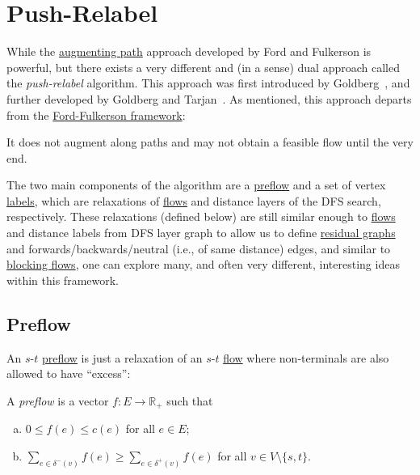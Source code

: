 \section{Push-Relabel}
While the \hyperref[def:augmenting-path]{augmenting path} approach developed by Ford and Fulkerson is powerful, but there exists a very different and (in a sense) dual approach called the \emph{push-relabel} algorithm. This approach was first introduced by Goldberg~\cite{goldberg1985new}, and further developed by Goldberg and Tarjan~\cite{goldberg1988new}. As mentioned, this approach departs from the \hyperref[algo:Ford-Fulkerson]{Ford-Fulkerson framework}:

\begin{note}
	It does not augment along paths and may not obtain a feasible flow until the very end.
\end{note}

The two main components of the algorithm are a \hyperref[def:preflow]{preflow} and a set of vertex \hyperref[def:label]{labels}, which are relaxations of \hyperref[def:flow]{flows} and distance layers of the DFS search, respectively. These relaxations (defined below) are still similar enough to \hyperref[def:flow]{flows} and distance labels from DFS layer graph to allow us to define \hyperref[def:residual-graph]{residual graphs} and forwards/backwards/neutral (i.e., of same distance) edges, and similar to \hyperref[def:blocking-flow]{blocking flows}, one can explore many, and often very different, interesting ideas within this framework.

\subsection{Preflow}
An \(s\)-\(t\) \hyperref[def:preflow]{preflow} is just a relaxation of an \(s\)-\(t\) \hyperref[def:flow]{flow} where non-terminals are also allowed to have ``excess'':

\begin{definition}[Preflow]\label{def:preflow}
	A \emph{preflow} is a vector \(f \colon E \to \mathbb{R} _{+}\) such that
	\begin{enumerate}[(a)]
		\item\label{def:preflow-capacity} \(0 \leq f(e) \leq c(e)\) for all \(e \in E\);
		\item\label{def:preflow-conservation} \(\sum_{e \in \delta ^-(v)} f(e) \geq \sum_{e \in \delta ^+(v)}f(e) \) for all \(v \in V \setminus \{ s, t \} \).
	\end{enumerate}
\end{definition}

